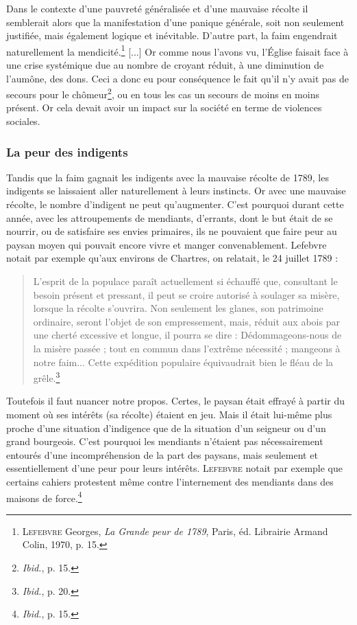 \documentclass[a4paper,11pt,]{scrartcl}
\begin{document}
Dans le contexte d'une pauvreté généralisée et d'une mauvaise récolte il semblerait alors que la manifestation d'une panique générale, soit non seulement justifiée, mais également logique et inévitable. D'autre part, la faim engendrait naturellement la mendicité.\footnote{\textsc{Lefebvre} Georges, \emph{La Grande peur de 1789}, Paris, éd. Librairie Armand Colin, 1970, p. 15.} [...] Or comme nous l'avons vu, l'Église faisait face à une crise systémique due au nombre de croyant réduit, à une diminution de l'aumône, des dons. Ceci a donc eu pour conséquence le fait qu'\og il n'y avait pas de secours pour le chômeur\fg\footnote{\emph{Ibid.}, p. 15.}, ou en tous les cas un secours de moins en moins présent. Or cela devait avoir un impact sur la société en terme de violences sociales.

\subsubsection{La peur des indigents}

Tandis que la faim gagnait les indigents avec la mauvaise récolte de 1789, les indigents se laissaient aller naturellement à leurs instincts. Or avec une mauvaise récolte, le nombre d'indigent ne peut qu'augmenter. C'est pourquoi durant cette année, avec les attroupements de mendiants, d'errants, dont le but était de se nourrir, ou de satisfaire ses envies primaires, ils ne pouvaient que faire peur au paysan moyen qui pouvait encore vivre et manger convenablement. Lefebvre notait par exemple qu'aux environs de Chartres, on relatait, le 24 juillet 1789 :
\begin{quotation}
 L'esprit de la populace paraît actuellement si échauffé que, consultant le besoin présent et pressant, il peut se croire autorisé à soulager sa misère, lorsque la récolte s'ouvrira. Non seulement les glanes, son patrimoine ordinaire, seront l'objet de son empressement, mais, réduit aux abois par une cherté excessive et longue, il pourra se dire : Dédommageons-nous de la misère passée ; tout en commun dans l'extrême nécessité ; mangeons à notre faim... Cette expédition populaire équivaudrait bien le fléau de la grêle.\footnote{\emph{Ibid.}, p. 20.}
\end{quotation}

Toutefois il faut nuancer notre propos. Certes, le paysan était effrayé à partir du moment où ses intérêts (sa récolte) étaient en jeu. Mais il était lui-même plus proche d'une situation d'indigence que de la situation d'un seigneur ou d'un grand bourgeois. C'est pourquoi les mendiants n'étaient pas nécessairement entourés d'une incompréhension de la part des paysans, mais seulement et essentiellement d'une peur pour leurs intérêts. \textsc{Lefebvre} notait par exemple que certains cahiers protestent même contre l'internement des mendiants dans des maisons de force.\footnote{\emph{Ibid.}, p. 15.}
\end{document}
